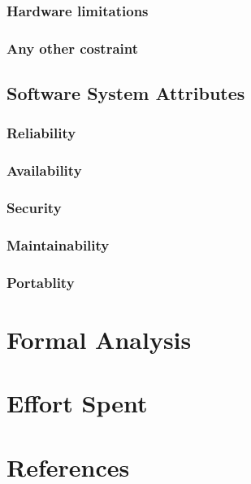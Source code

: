 \documentclass[12pt,a4paper]{report}
\begin{document}
		\subsection{Hardware limitations}
		\subsection{Any other costraint}
	\section{Software System Attributes}
		\subsection{Reliability}
		\subsection{Availability}
		\subsection{Security}
		\subsection{Maintainability}
		\subsection{Portablity}

\chapter{Formal Analysis}

\chapter{Effort Spent}

\chapter{References}
\end{document}
